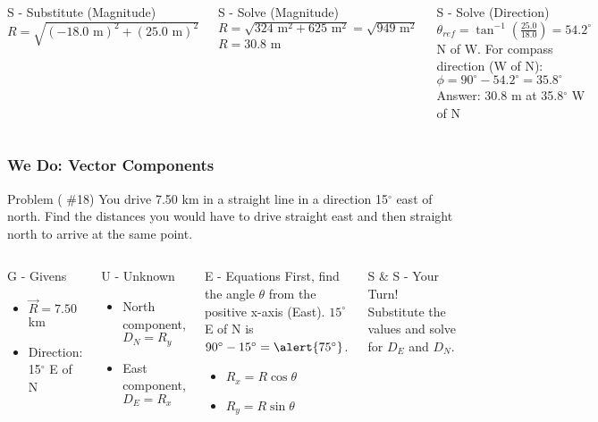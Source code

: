 \documentclass{beamer}
\begin{document}
\begin{frame}[fragile]
\begin{columns}
\begin{block}{S - Substitute (Magnitude)}
$R = \sqrt{(-18.0 \text{ m})^2 + (25.0 \text{ m})^2}$
\end{block}
\pause
\begin{block}{S - Solve (Magnitude)}
$R = \sqrt{324 \text{ m}^2 + 625 \text{ m}^2} = \sqrt{949 \text{ m}^2}$
$R = 30.8$ m
\end{block}
\pause
\begin{block}{S - Solve (Direction)}
$\theta_{ref} = \tan^{-1}\left(\frac{25.0}{18.0}\right) = 54.2^\circ$ N of W.
\vspace{0.5em}
For compass direction (W of N):
$\phi = 90^\circ - 54.2^\circ = 35.8^\circ$
\vspace{0.5em}
\alert{Answer: 30.8 m at 35.8$^\circ$ W of N}
\end{block}
\end{columns}
\end{frame}

\begin{frame}
\frametitle{We Do: Vector Components}
\begin{block}{Problem ( \#18)}
You drive 7.50 km in a straight line in a direction 15$^\circ$ east of north. Find the distances you would have to drive straight east and then straight north to arrive at the same point.
\end{block}
\pause
\begin{columns}
\begin{block}{G - Givens}
\begin{itemize}
    \item $\vec{R} = 7.50$ km
    \item Direction: 15$^\circ$ E of N
\end{itemize}
\end{block}
\begin{block}{U - Unknown}
\begin{itemize}
    \item North component, $D_N = R_y$
    \item East component, $D_E = R_x$
\end{itemize}
\end{block}
\begin{block}{E - Equations}
First, find the angle $\theta$ from the positive x-axis (East).
$15^\circ$ E of N is $90^\circ - 15^\circ = \alert{75^\circ}$.
\begin{itemize}
    \item $R_x = R \cos \theta$
    \item $R_y = R \sin \theta$
\end{itemize}
\end{block}
\pause
\begin{block}{S \& S - Your Turn!}
Substitute the values and solve for $D_E$ and $D_N$.
\end{block}
\end{columns}
\end{frame}
\end{document}
